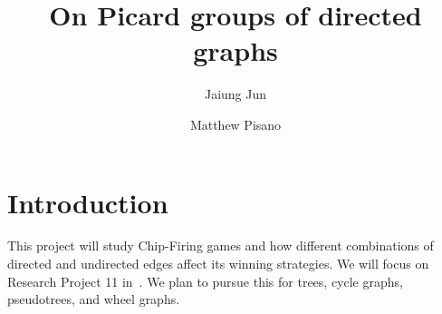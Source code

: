 \documentclass[11pt,reqno]{amsart}
\DeclareMathOperator{\Pic}{Pic}
\newcommand{\Jac}{\textrm{Jac}}{}
\theoremstyle{definition}
\newtheorem*{goal}{\textbf{Goal}}
\theoremstyle{plain}
\begin{document}
\title{On Picard groups of directed graphs}

\author{Jaiung Jun}
\address{Department of Mathematics, State University of New York at New Paltz, NY 12561, USA}

\author{Matthew Pisano}
\address{Department of Mathematics, State University of New York at New Paltz, NY 12561, USA}



\maketitle

\section{Introduction}
	This project will study Chip-Firing games and how different combinations of directed and undirected edges
	affect its winning strategies. We will focus on Research Project 11 in~\cite{glass2020chip}.
	We plan to pursue this for trees, cycle graphs, pseudotrees, and wheel graphs.

\end{document}
